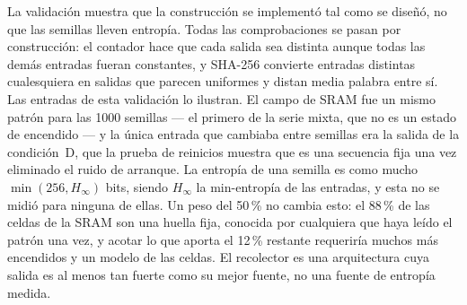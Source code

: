 La validación muestra que la construcción se implementó tal como se
diseñó, no que las semillas lleven entropía. Todas las comprobaciones se
pasan por construcción: el contador hace que cada salida sea distinta
aunque todas las demás entradas fueran constantes, y SHA-256 convierte
entradas distintas cualesquiera en salidas que parecen uniformes y distan
media palabra entre sí. Las entradas de esta validación lo ilustran. El
campo de SRAM fue un mismo patrón para las 1000 semillas --- el primero
de la serie mixta, que no es un estado de encendido --- y la única
entrada que cambiaba entre semillas era la salida de la condición~D, que
la prueba de reinicios muestra que es una secuencia fija una vez
eliminado el ruido de arranque. La entropía de una semilla es como mucho
$\min(256, H_\infty)$ bits, siendo $H_\infty$ la min-entropía de las
entradas, y esta no se midió para ninguna de ellas. Un peso del 50\,\% no
cambia esto: el 88\,\% de las celdas de la SRAM son una huella fija,
conocida por cualquiera que haya leído el patrón una vez, y acotar lo que
aporta el 12\,\% restante requeriría muchos más encendidos y un modelo de
las celdas. El recolector es una arquitectura cuya salida es al menos tan
fuerte como su mejor fuente, no una fuente de entropía medida.

